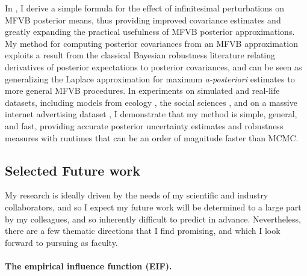 In \citet{giordano:2015:linear, giordano:2018:covariances}, I derive a simple
formula for the effect of infinitesimal perturbations on MFVB posterior means,
thus providing improved covariance estimates and greatly expanding the practical
usefulness of MFVB posterior approximations. My method for computing posterior
covariances from an MFVB approximation exploits a result from the classical
Bayesian robustness literature relating derivatives of posterior expectations to
posterior covariances, and can be seen as generalizing the Laplace approximation
for maximum \emph{a-posteriori} estimates to more general MFVB procedures.
In experiments on simulated and real-life datasets,  including models from
ecology \citep{kery:2011:bayesian}, the social sciences \citep{gelman:2006:arm},
and on a massive internet advertising dataset \citep{criteo:2014:dataset}, I
demonstrate that my method is simple, general, and fast, providing accurate
posterior uncertainty estimates and robustness measures with runtimes that can
be an order of magnitude faster than MCMC.




\clearpage
\subsection*{Selected Future work}

My research is ideally driven by the needs of my scientific and industry
collaborators, and so I expect my future work will be determined to a large part
by my colleagues, and so inherently difficult to predict in advance.
Nevertheless, there are a few thematic directions that I find promising,
and which I look forward to pursuing as faculty.

\paragraph{The empirical influence function (EIF).}

